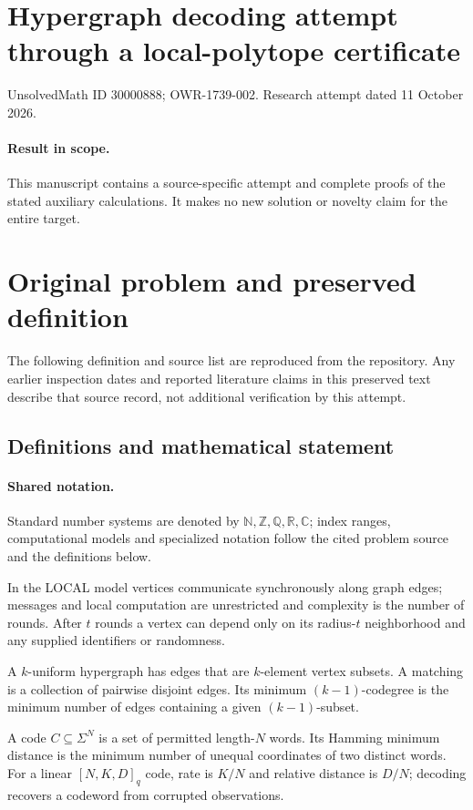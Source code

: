 \documentclass[11pt]{article}
\begin{document}
\section*{Hypergraph decoding attempt through a local-polytope certificate}
\noindent UnsolvedMath ID 30000888; OWR-1739-002. Research attempt dated 11 October 2026.
\paragraph{Result in scope.}This manuscript contains a source-specific attempt and complete proofs of the stated auxiliary calculations. It makes no new solution or novelty claim for the entire target.
\section{Original problem and preserved definition}
The following definition and source list are reproduced from the repository. Any earlier inspection dates and reported literature claims in this preserved text describe that source record, not additional verification by this attempt.
\subsection{Definitions and mathematical statement}

\paragraph{Shared notation.}Standard number systems are denoted by $\mathbb N,\mathbb Z,\mathbb Q,\mathbb R,\mathbb C$; index ranges, computational models and specialized notation follow the cited problem source and the definitions below.


In the LOCAL model vertices communicate synchronously along graph edges; messages and local computation are unrestricted and complexity is the number of rounds. After $t$ rounds a vertex can depend only on its radius-$t$ neighborhood and any supplied identifiers or randomness.

A $k$-uniform hypergraph has edges that are $k$-element vertex subsets. A matching is a collection of pairwise disjoint edges. Its minimum $(k-1)$-codegree is the minimum number of edges containing a given $(k-1)$-subset.

A code $C\subseteq\Sigma^N$ is a set of permitted length-$N$ words. Its Hamming minimum distance is the minimum number of unequal coordinates of two distinct words. For a linear $[N,K,D]_q$ code, rate is $K/N$ and relative distance is $D/N$; decoding recovers a codeword from corrupted observations.
\end{document}
